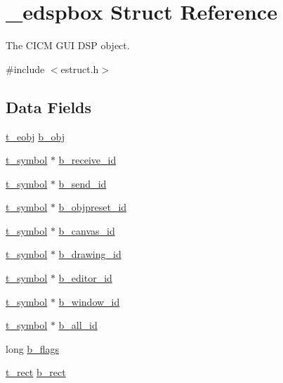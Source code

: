 \hypertarget{struct__edspbox}{\section{\-\_\-edspbox Struct Reference}
\label{struct__edspbox}
}


The C\-I\-C\-M G\-U\-I D\-S\-P object.  




{\ttfamily \#include $<$estruct.\-h$>$}

\subsection*{Data Fields}
\begin{DoxyCompactItemize}
\item 
\hyperlink{struct__eobj}{t\-\_\-eobj} \hyperlink{struct__edspbox_a384a670299e98768527fbe457de9a38a}{b\-\_\-obj}
\item 
\hyperlink{struct__symbol}{t\-\_\-symbol} $\ast$ \hyperlink{struct__edspbox_a3fb2b6968877ffd009753ccc0fe96769}{b\-\_\-receive\-\_\-id}
\item 
\hyperlink{struct__symbol}{t\-\_\-symbol} $\ast$ \hyperlink{struct__edspbox_ac59460230e622f821660b599e2f96ca9}{b\-\_\-send\-\_\-id}
\item 
\hyperlink{struct__symbol}{t\-\_\-symbol} $\ast$ \hyperlink{struct__edspbox_adc377263d208d1051f4a0997868b1155}{b\-\_\-objpreset\-\_\-id}
\item 
\hyperlink{struct__symbol}{t\-\_\-symbol} $\ast$ \hyperlink{struct__edspbox_ac0251c6969a1032f8f50d076e909fb3e}{b\-\_\-canvas\-\_\-id}
\item 
\hyperlink{struct__symbol}{t\-\_\-symbol} $\ast$ \hyperlink{struct__edspbox_a153f9c9929d722ecb29217f3fb0914c9}{b\-\_\-drawing\-\_\-id}
\item 
\hyperlink{struct__symbol}{t\-\_\-symbol} $\ast$ \hyperlink{struct__edspbox_adf8c80c6ea45ad810c754984d98830ff}{b\-\_\-editor\-\_\-id}
\item 
\hyperlink{struct__symbol}{t\-\_\-symbol} $\ast$ \hyperlink{struct__edspbox_a7033df943e798c68e3a6117785c2d79e}{b\-\_\-window\-\_\-id}
\item 
\hyperlink{struct__symbol}{t\-\_\-symbol} $\ast$ \hyperlink{struct__edspbox_a0f63dcf604135dd4fbfbf43eaed53c1a}{b\-\_\-all\-\_\-id}
\item 
long \hyperlink{struct__edspbox_abdae234dbd983dfbfb0592858c4ff026}{b\-\_\-flags}
\item 
\hyperlink{struct__rect}{t\-\_\-rect} \hyperlink{struct__edspbox_abc70ff46c135ee9f377a038bbc05a33e}{b\-\_\-rect}

\end{DoxyCompactItemize}
